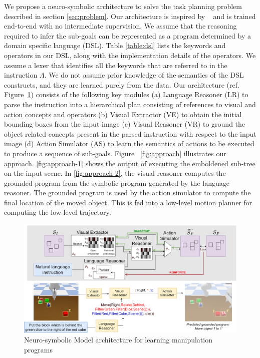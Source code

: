 We propose a neuro-symbolic architecture to solve the task planning problem described in section \ref{sec:problem}. Our architecture is inspired by ~\cite{Mao2019NeuroSymbolic} and is trained end-to-end with no intermediate supervision.
%
We assume that the reasoning required to infer the sub-goals can be represented as a program determined by a domain specific language (DSL). Table \ref{table:dsl} lists the keywords and operators in our DSL, along with the implementation details of the operators. We assume a lexer that identifies all the keywords that are referred to in the  instruction $\Lambda$. We do not assume prior knowledge of the semantics of the DSL constructs, and they are learned purely from the data.
%
Our architecture (ref. Figure~\ref{fig:schematic}) consists of the following key modules (a) Language Reasoner (LR) to parse the instruction into a hierarchical plan consisting of references to visual and action concepts and operators (b) Visual Extractor (VE) to obtain the initial bounding boxes from the input image (c) Visual Reasoner (VR) to ground the object related concepts present in the parsed instruction with respect to the input image (d) Action Simulator (AS) to learn the semantics of actions to be executed to produce a sequence of sub-goals. Figure ~\ref{fig:approach} illustrates our approach. \ref{fig:approach-1} shows the output of executing the emboldened sub-tree on the input scene. In \ref{fig:approach-2}, the visual reasoner computes the grounded program from the symbolic program generated by the language reasoner. The grounded program is used by the action simulator to compute the final location of the moved object. This is fed into a low-level motion planner for computing the low-level trajectory.

\begin{figure}
    \centering 
    \includegraphics[width=\textwidth,clip,trim={0 20.5cm 0 0}]{figures/main-model-3.png}
    \caption{Neuro-symbolic Model architecture for learning manipulation programs}
    \label{fig:schematic}
\end{figure}

